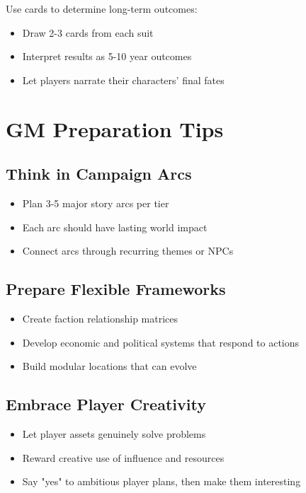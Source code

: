 Use cards to determine long-term outcomes:
\begin{itemize}
    \item Draw 2-3 cards from each suit
    \item Interpret results as 5-10 year outcomes
    \item Let players narrate their characters' final fates
\end{itemize}

\section{GM Preparation Tips}

\subsection*{Think in Campaign Arcs}

\begin{itemize}
    \item Plan 3-5 major story arcs per tier
    \item Each arc should have lasting world impact
    \item Connect arcs through recurring themes or NPCs
\end{itemize}

\subsection*{Prepare Flexible Frameworks}

\begin{itemize}
    \item Create faction relationship matrices
    \item Develop economic and political systems that respond to actions
    \item Build modular locations that can evolve
\end{itemize}

\subsection*{Embrace Player Creativity}

\begin{itemize}
    \item Let player assets genuinely solve problems
    \item Reward creative use of influence and resources
    \item Say "yes" to ambitious player plans, then make them interesting
\end{itemize}


